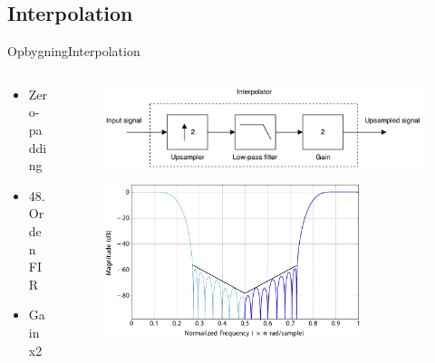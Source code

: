 


\subsection{Interpolation}
\begin{frame}{Opbygning}{Interpolation}

\begin{columns}
  \begin{column}{0.4\textwidth}
\begin{itemize}
\item Zero-padding
\item 48. Orden FIR
\item Gain x2
\end{itemize}
  \end{column}

  \begin{column}{0.6\textwidth}
\begin{figure}
\centering
\includegraphics[width=\textwidth]{designRealInterpolator}
\end{figure}
\begin{figure}
	\centering
	\includegraphics[width=0.8\textwidth]{DecIntCompMirror}
\end{figure}

  \end{column}
\end{columns}

\end{frame}


